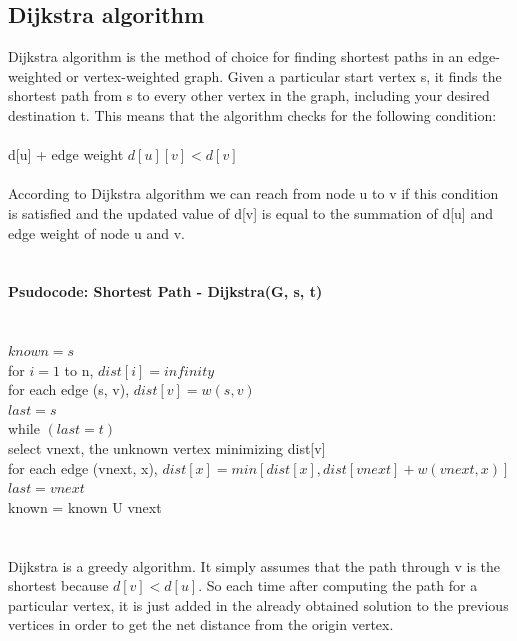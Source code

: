 \documentclass[a4paper,10pt]{article}
\begin{document}
\begin{multicols}{2}
\subsection{Dijkstra algorithm}
Dijkstra algorithm is the method of choice for finding shortest paths in an edge-weighted or vertex-weighted graph. Given a particular start vertex s, it finds the shortest path from s to every other vertex in the graph, including your desired destination t. This means that the algorithm checks for the following condition:
\\\\d[u] + edge weight $d[u][v] < d[v]$
\\\\According to Dijkstra algorithm we can reach from node u to v if this condition is satisfied and the updated value of d[v] is equal to the summation of d[u] and edge weight of  node u and v.
\\\\\\
\textbf{\large Psudocode: Shortest Path - Dijkstra(G, s, t)}
\\\\
\\$known = {s}$
\\for $i = 1$ to n, $dist[i] = infinity$
\\for each edge (s, v), $dist[v] = w(s, v)$
\\$last = s$
\\while $(last = t)$
\\select vnext, the unknown vertex minimizing dist[v]
\\for each edge (vnext, x), $dist[x] = min[dist[x], dist[vnext] + w(vnext, x)]$
\\$last = vnext$
\\known = known U {vnext}
\\\\
\\Dijkstra is a greedy algorithm. It simply assumes that the path through v is the shortest because $d[v] < d[u]$. So each time after computing the path for a particular vertex, it is just added in the already obtained solution to the previous vertices in order to get the net distance from the origin vertex.\\\\


\end{multicols}
\end{document}
